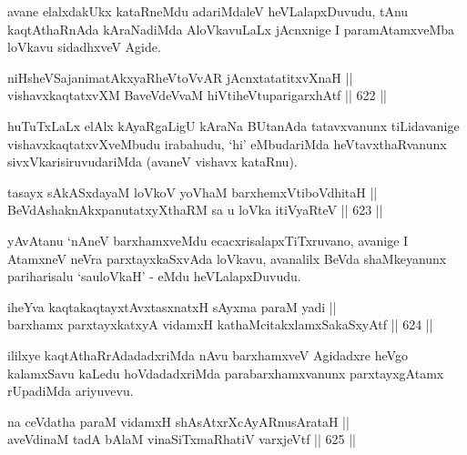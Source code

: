 \begin{artha}
avane elalxdakUkx kataRneMdu adariMdaleV heVLalapxDuvudu, tAnu
kaqtAthaRnAda kAraNadiMda AloVkavuLaLx jAcnxnige I paramAtamxveMba
loVkavu sidadhxveV Agide.
\end{artha}


\begin{shl}
niHsheVSajanimatAkxyaRheVtoVvAR jAcnxtatatitxvXnaH || \\
vishavxkaqtatxvXM BaveVdeVvaM hiVtiheVtuparigarxhAtf \hfill || 622 ||  
\end{shl}

\begin{artha}
huTuTxLaLx elAlx kAyaRgaLigU kAraNa BUtanAda tatavxvanunx tiLidavanige
vishavxkaqtatxvXveMbudu irabahudu, `hi' eMbudariMda heVtavxthaRvanunx
sivxVkarisiruvudariMda (avaneV vishavx kataRnu).
\end{artha}


\begin{shl}
tasayx sAkASxdayaM loVkoV yoV\s haM barxhemxVtiboVdhitaH || \\
BeVdAshaknAkxpanutatxyXthaRM sa u loVka itiVyaRteV \hfill || 623 ||  
\end{shl}

\begin{artha}
yAvAtanu `nAneV barxhamxveMdu ecacxrisalapxTiTxruvano, avanige I AtamxneV neVra parxtayxkaSxvAda loVkavu, avanalilx BeVda shaMkeyanunx pariharisalu `sauloVkaH' - eMdu heVLalapxDuvudu.
\end{artha}


\begin{shl}
iheYva kaqtakaqtayxtAvxtasxnatxH sAyxma paraM yadi || \\
barxhamx parxtayxkatxyA vidamxH kathaMcitakxlamxSakaSxyAtf \hfill || 624 ||  
\end{shl}

\begin{artha}
ililxye kaqtAthaRrAdadadxriMda nAvu barxhamxveV Agidadxre heVgo kalamxSavu kaLedu hoVdadadxriMda parabarxhamxvanunx parxtayxgAtamx rUpadiMda ariyuvevu.
\end{artha}

\begin{shl}
na ceVdatha paraM vidamxH shAsAtxrXcAyARnusArataH || \\
aveVdinaM tadA bAlaM vinaSiTxmaRhatiV varxjeVtf \hfill || 625 ||  
\end{shl}

